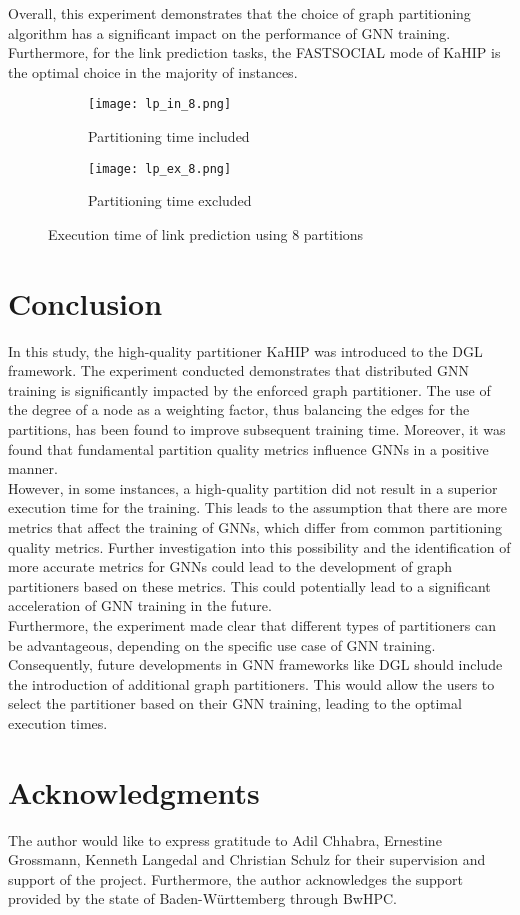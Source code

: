 \documentclass[acmsmall,nonacm,screen,review]{acmart}
\begin{document}
Overall, this experiment demonstrates that the choice of graph partitioning algorithm has a significant impact on the performance of GNN training. Furthermore, for the link prediction tasks, the FASTSOCIAL mode of KaHIP is the optimal choice in the majority of instances.
\begin{figure}[bt!]
     \centering
     \begin{subfigure}[b]{0.45\textwidth}
         \centering
         \texttt{[image: lp\_in\_8.png]}
         \caption{Partitioning time included}
         \label{lp_in_4}
     \end{subfigure}
     \hfill
     \begin{subfigure}[b]{0.45\textwidth}
         \centering
         \texttt{[image: lp\_ex\_8.png]}
         \caption{Partitioning time excluded}
         \label{lp_ex_4}
     \end{subfigure}
     \caption{Execution time of link prediction using 8 partitions}
     \label{lp_results}
\end{figure}
\section{Conclusion}
In this study, the high-quality partitioner KaHIP was introduced to the DGL framework. The experiment conducted demonstrates that distributed GNN training is significantly impacted by the enforced graph partitioner. The use of the degree of a node as a weighting factor, thus balancing the edges for the partitions, has been found to improve subsequent training time. Moreover, it was found that fundamental partition quality metrics influence GNNs in a positive manner.\\
However, in some instances, a high-quality partition did not result in a superior execution time for the training. This leads to the assumption that there are more metrics that affect the training of GNNs, which differ from common partitioning quality metrics. Further investigation into this possibility and the identification of more accurate metrics for GNNs could lead to the development of graph partitioners based on these metrics. This could potentially lead to a significant acceleration of GNN training in the future.\\
Furthermore, the experiment made clear that different types of partitioners can be advantageous, depending on the specific use case of GNN training. Consequently, future developments in GNN frameworks like DGL should include the introduction of additional graph partitioners. This would allow the users to select the partitioner based on their GNN training, leading to the optimal execution times.
\section{Acknowledgments}
The author would like to express gratitude to Adil Chhabra, Ernestine Grossmann, Kenneth Langedal and Christian Schulz for their supervision and support of the project. Furthermore, the author acknowledges the support provided by the state of Baden-Württemberg through BwHPC.


\end{document}
